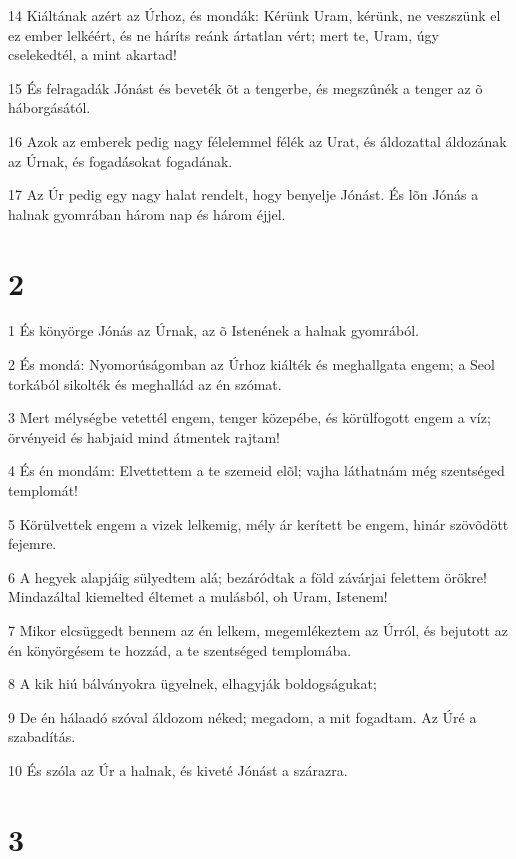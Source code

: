 \par 14 Kiáltának azért az Úrhoz, és mondák: Kérünk Uram, kérünk, ne veszszünk el ez ember lelkéért, és ne háríts reánk ártatlan vért; mert te, Uram, úgy cselekedtél, a mint akartad!
\par 15 És felragadák Jónást és beveték õt a tengerbe, és megszûnék a tenger az õ háborgásától.
\par 16 Azok az emberek pedig nagy félelemmel félék az Urat, és áldozattal áldozának az Úrnak, és fogadásokat fogadának.
\par 17 Az Úr pedig egy nagy halat rendelt, hogy benyelje Jónást. És lõn Jónás a halnak gyomrában három nap és három éjjel.

\chapter{2}

\par 1 És könyörge Jónás az Úrnak, az õ Istenének a halnak gyomrából.
\par 2 És mondá: Nyomorúságomban az Úrhoz kiálték és meghallgata engem; a Seol torkából sikolték és meghallád az én szómat.
\par 3 Mert mélységbe vetettél engem, tenger közepébe, és körülfogott engem a víz; örvényeid és habjaid mind átmentek rajtam!
\par 4 És én mondám: Elvettettem a te szemeid elõl; vajha láthatnám még szentséged templomát!
\par 5 Körülvettek engem a vizek lelkemig, mély ár kerített be engem, hinár szövõdött fejemre.
\par 6 A hegyek alapjáig sülyedtem alá; bezáródtak a föld závárjai felettem örökre! Mindazáltal kiemelted éltemet a mulásból, oh Uram, Istenem!
\par 7 Mikor elcsüggedt bennem az én lelkem, megemlékeztem az Úrról, és bejutott az én könyörgésem te hozzád, a te szentséged templomába.
\par 8 A kik hiú bálványokra ügyelnek, elhagyják boldogságukat;
\par 9 De én hálaadó szóval áldozom néked; megadom, a mit fogadtam. Az Úré a szabadítás.
\par 10 És szóla az Úr a halnak, és kiveté Jónást a szárazra.

\chapter{3}

